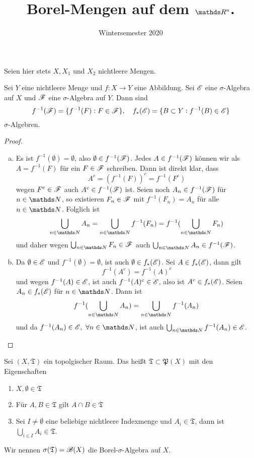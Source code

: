 \documentclass{scrartcl}
\title{Borel-Mengen auf dem $\R^n$.}
\date{Wintersemester 2020}
\author{}
\begin{document}
    \maketitle Seien hier stets $X,X_1$ und $X_2$ nichtleere Mengen. 
    \begin{lemma}
        Sei $Y$ eine nichtleere Menge und $f:X\to Y$ eine Abbildung. Sei $\mathscr{E}$ eine $\sigma$-Algebra auf $X$ und $\mathscr{F}$ eine $\sigma$-Algebra auf $Y$. Dann sind 
        \[
        f^{-1}(\mathscr{F})=\{f^{-1}(F):F\in \mathscr{F}\}, \quad  f_*(\mathscr{E})=\{B\subset Y:f^{-1}(B)\in \mathscr{E}\}
        \]
        $\sigma$-Algebren.
    \end{lemma}
    \begin{proof}
        \begin{enumerate}[(a)]
            \item Es ist $f^{-1}(\emptyset) = \emptyset$, also $\emptyset\in f^{-1}(\mathscr{F})$. Jedes $A\in f^{-1}(\mathscr{F})$ können wir als $A=f^{-1}(F)$ für ein $F\in \mathscr{F}$ schreiben. Dann ist direkt klar, dass
            \[
            A^c =(f^{-1}(F))^c = f^{-1}(F^c)    
            \] wegen $F^c\in \mathscr{F}$ auch $A^c\in f^{-1}(\mathscr{F})$ ist. Seien noch $A_n\in f^{-1}(\mathscr{F})$ für $n\in \N$, so existieren $F_n \in \mathscr{F}$ mit $f^{-1}(F_n) = A_n$ für alle $n\in \N$. Folglich ist
            \[
            \bigcup_{n\in \N} A_n = \bigcup_{n\in \N}f^{-1}(F_n) = f^{-1}(\bigcup_{n\in \N}F_n)    
            \] und daher wegen $\bigcup_{n\in \N}F_n \in \cali{F}$ auch $\bigcup_{n\in \N}A_n\in f^{-1}(\cali{F})$.
        \item Da $\emptyset\in \mathscr{E}$ und $f^{-1}(\emptyset) = \emptyset$, ist auch $\emptyset\in f_*(\mathscr{E})$. Sei $A\in f_*(\mathscr{E})$, dann gilt
        \[
        f^{-1}(A^c) = f^{-1}(A)^c    
        \] und wegen $f^{-1}(A)\in \mathscr{E}$, ist auch $f^{-1}(A)^c\in \mathscr{E}$, also ist $A^c\in f_*(\mathscr{E})$. Seien $A_n\in f_*(\mathscr{E})$ für $n\in \N$. Dann ist
        \[
        f^{-1}(\bigcup_{n\in\N}A_n) = \bigcup_{n\in\N} f^{-1}(A_n)    
        \] und da $f^{-1}(A_n) \in \cali{E}, \ \forall n\in \N$, ist auch $\bigcup_{n\in\N} f^{-1}(A_n)\in \cali{E}$.
        \end{enumerate}
    \end{proof}
    \begin{defn}
        Sei $(X,\mathfrak{T})$ ein topolgischer Raum. Das heißt $\mathfrak{T}\subset \mathfrak{P}(X)$ mit den Eigenschaften
        \begin{enumerate}[(1)]
            \item $X,\emptyset \in \mathfrak{T}$
            \item Für $A,B \in \mathfrak{T}$ gilt $A\cap B\in \mathfrak{T}$
            \item Sei $I\neq \emptyset$ eine beliebige nichtleere Indexmenge und $A_i\in \mathfrak{T}$, dann ist $\bigcup_{i\in I} A_i \in \mathfrak{T}$.
        \end{enumerate}
        Wir nennen $\sigma(\mathfrak{T})=\mathscr{B}(X)$ die Borel-$\sigma$-Algebra auf $X$.
    \end{defn}
\end{document}
